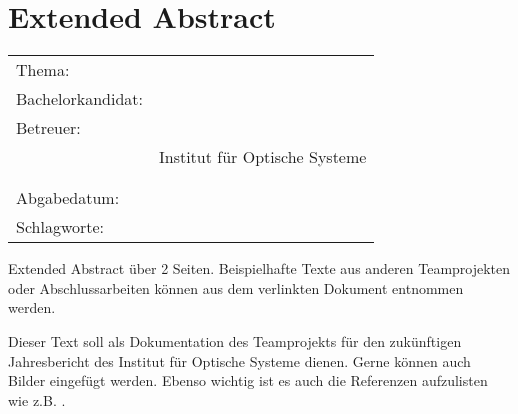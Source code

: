 \thispagestyle{plain}
\chapter*{Extended Abstract}
\label{ch:extended-abstract}

\begin{refsection}

\begin{center}
	\begin{tabular}{p{3.2cm}p{9.6cm}}
		Thema: & \thema \\[1ex]
		Bachelorkandidat: & \autor \\[1ex]
		Betreuer: & \prueferA \\
		 & Institut für Optische Systeme\\[1ex]
		 & \prueferB \\
		 & \firma \\[1ex]
		Abgabedatum: & \abgabedatum \\[1ex]
		Schlagworte: & \schlagworte \\[1ex]
	\end{tabular}
\end{center}

Extended Abstract über 2 Seiten. Beispielhafte Texte aus anderen Teamprojekten oder Abschlussarbeiten können aus dem verlinkten Dokument entnommen werden.

Dieser Text soll als Dokumentation des Teamprojekts für den zukünftigen Jahresbericht des Institut für Optische Systeme dienen. Gerne können auch Bilder eingefügt werden. Ebenso wichtig ist es auch die Referenzen aufzulisten wie z.B. \cite{rusu2011pcl}.

\printbibliography[heading=subbibliography]

\end{refsection}
\newpage
